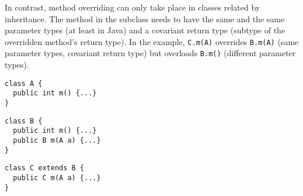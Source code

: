 \begin{parts}
\begin{solution}
In contrast, method overriding can only take place in classes related by
inheritance.
The method in the subclass needs to have the same and the same parameter types
(at least in Java) and a covariant return type (subtype of the overridden
method's return type).
In the example, \verb+C.m(A)+ overrides \verb+B.m(A)+ (same parameter types,
covariant return type) but overloads \verb+B.m()+ (different parameter types).

\begin{minipage}[t]{.3\textwidth}
\begin{Verbatim}
class A {
  public int m() {...}
}

\end{Verbatim}
\end{minipage}
\hfill
\begin{minipage}[t]{.3\textwidth}
\begin{Verbatim}
class B {
  public int m() {...}
  public B m(A a) {...}
}
\end{Verbatim}
\end{minipage}
\hfill
\begin{minipage}[t]{.3\textwidth}
\begin{Verbatim}
class C extends B {
  public C m(A a) {...}
}

\end{Verbatim}
\end{minipage}


\end{solution}

\end{parts}
